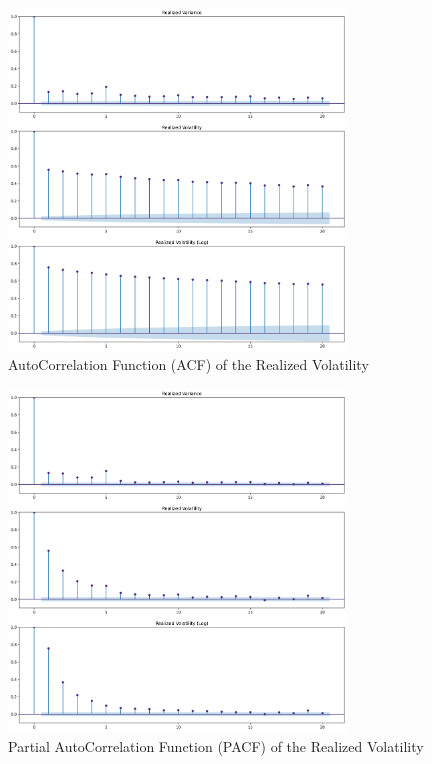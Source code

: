 \documentclass[12pt,twoside]{article}
\begin{document}
\begin{enumerate}[label = \arabic*)]
\begin{solution}
        \begin{figure}[!htbp]
            \centering
            \caption{AutoCorrelation Function (ACF) of the Realized Volatility}
            \label{fig:realized_volatility_acf}
            \includegraphics[width=0.8\textwidth]{images/realized_volatility_acf.png}
        \end{figure}
        
        \begin{figure}[!htbp]
            \centering
            \caption{Partial AutoCorrelation Function (PACF) of the Realized Volatility}
            \label{fig:realized_volatility_pacf}
            \includegraphics[width=0.8\textwidth]{images/realized_volatility_pacf.png}
        \end{figure}
        
    \end{solution}
\end{enumerate}
\end{document}
